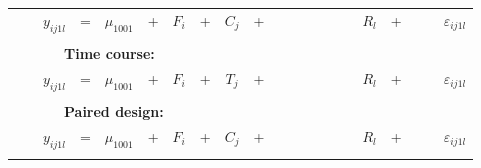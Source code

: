 \documentclass[10pt]{article}
\begin{document}
\begin{figure}[ht]
\begin{center}
{\begin{tabular}{|ccccccccccccccccccccc|}
&&$y_{ij1l}$  & = & $\mu_{1001}$ & + & $F_i$ & + & $C_j$ & + &  &  &  && & & $R_l$ & + &  & &$\varepsilon_{ij1l}$  \\
&&&&&&&&&&&&&&&&&&&& \\
&&\multicolumn{4}{l}{\ \ \ {\bf Time course:}}  &&&&&&&&&&&&&&&\\
&&$y_{ij1l}$  & = & $\mu_{1001}$ & + & $F_i$ & + & $T_j$ & + &   &  & &  &  &  & $R_l$ & + &  &  & $\varepsilon_{ij1l}$  \\
&&&&&&&&&&&&&&&&&&&& \\
&&\multicolumn{8}{l}{\ \ \ {\bf Paired design:}}  &&&&&&&&&&&\\
&&$y_{ij1l}$  & = & $\mu_{1001}$ & + & $F_i$ & + & $C_j$ & + &   &  &  &  &  &   & $R_l$ & + & &  & $\varepsilon_{ij1l}$  \\
&&&&&&&&&&&&&&&&&&&& \\
\hline
\end{tabular}
\label{fig:DDA-model}
}

\end{center}
\end{figure}

\end{document}
